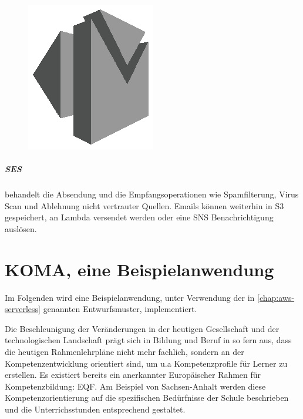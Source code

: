 \documentclass[
12pt,
english,
ngerman,
headsepline,
twoside,
openright,
numbers=noenddot,version=first
]{scrreprt}
\begin{document}
\begin{figure}
	\includegraphics[width=0.9\linewidth]{./pics/aws/Messaging_GRAYSCALE_AmazonSES.eps}
\end{figure}
\paragraph{\acrfull{SES}} behandelt die Absendung und die Empfangsoperationen wie Spamfilterung, Virus Scan und Ablehnung nicht vertrauter Quellen. Emails können weiterhin in \acrshort{S3} gespeichert, an Lambda versendet werden oder eine \acrshort{SNS} Benachrichtigung auslösen.

\chapter{KOMA, eine Beispielanwendung}\label{sec:KOMA} 
Im Folgenden wird eine Beispielanwendung, unter Verwendung der in \autoref{chap:aws-serverless} genannten Entwurfsmuster, implementiert.

Die Beschleunigung der Veränderungen in der heutigen Gesellschaft und der technologischen Landschaft prägt sich in Bildung und Beruf in so fern aus, dass die heutigen Rahmenlehrpläne nicht mehr fachlich, sondern an der Kompetenzentwicklung orientiert sind, um u.a Kompetenzprofile für Lerner zu erstellen. Es existiert bereits ein anerkannter Europäischer Rahmen\cite{EQF} für Kompetenzbildung: \acrfull{EQF}. Am Beispiel von Sachsen-Anhalt\cite{BildungsServerSachsen} werden diese Kompetenzorientierung auf die spezifischen Bedürfnisse der Schule beschrieben und die Unterrichsstunden entsprechend gestaltet.
\end{document}
